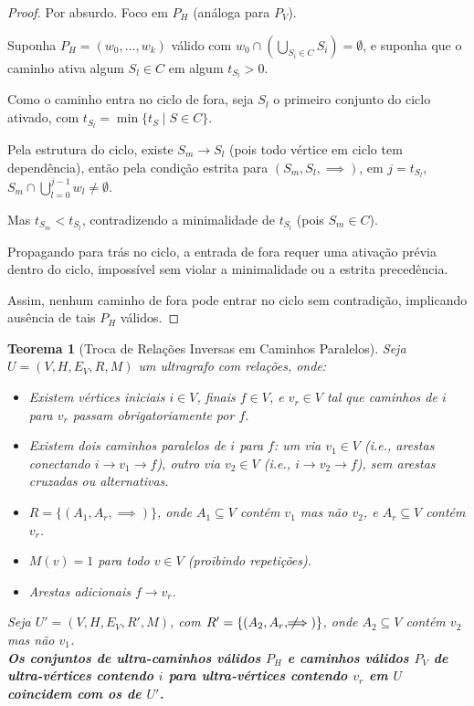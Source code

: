 \documentclass{article}
\newtheorem{theorem}{Teorema}
\begin{document}
\begin{proof}
Por absurdo. Foco em \( P_H \) (análoga para \( P_V \)).

Suponha \( P_H = (w_0, \dots, w_k) \) válido com \( w_0 \cap \left( \bigcup_{S_i \in C} S_i \right) = \emptyset \), e suponha que o caminho ativa algum \( S_l \in C \) em algum \( t_{S_l} > 0 \).

Como o caminho entra no ciclo de fora, seja \( S_l \) o primeiro conjunto do ciclo ativado, com \( t_{S_l} = \min \{ t_S \mid S \in C \} \).

Pela estrutura do ciclo, existe \( S_m \to S_l \) (pois todo vértice em ciclo tem dependência), então pela condição estrita para \( (S_m, S_l, \implies) \), em \( j = t_{S_l} \), \( S_m \cap \bigcup_{l=0}^{j-1} w_l \neq \emptyset \).

Mas \( t_{S_m} < t_{S_l} \), contradizendo a minimalidade de \( t_{S_l} \) (pois \( S_m \in C \)).

Propagando para trás no ciclo, a entrada de fora requer uma ativação prévia dentro do ciclo, impossível sem violar a minimalidade ou a estrita precedência.

Assim, nenhum caminho de fora pode entrar no ciclo sem contradição, implicando ausência de tais \( P_H \) válidos.
\end{proof}

\newpage
\begin{theorem}[Troca de Relações Inversas em Caminhos Paralelos]
\hfill

Seja \( U = (V, H, E_V, R, M) \) um ultragrafo com relações, onde:

\begin{itemize}
    \item Existem vértices iniciais \( i \in V \), finais \( f \in V \), e \( v_r \in V \) tal que caminhos de \( i \) para \( v_r \) passam obrigatoriamente por \( f \).
    \item Existem dois caminhos paralelos de \( i \) para \( f \): um via \( v_1 \in V \) (i.e., arestas conectando \( i \to v_1 \to f \)), outro via \( v_2 \in V \) (i.e., \( i \to v_2 \to f \)), sem arestas cruzadas ou alternativas.
    \item \( R = \{ (A_1, A_r, \implies) \} \), onde \( A_1 \subseteq V \) contém \( v_1 \) mas não \( v_2 \), e \( A_r \subseteq V \) contém \( v_r \).
    \item \( M(v) = 1 \) para todo \( v \in V \) (proibindo repetições).
    \item Arestas adicionais \( f \to v_r \).
\end{itemize}

Seja \( U' = (V, H, E_V, R', M) \), com \( R' = \{ (A_2, A_r, \not\!\!\!\implies) \} \), onde \( A_2 \subseteq V \) contém \( v_2 \) mas não \( v_1 \).
\\

\textbf{Os conjuntos de ultra-caminhos válidos \( P_H \) e caminhos válidos \( P_V \) de ultra-vértices contendo \( i \) para ultra-vértices contendo \( v_r \) em \( U \) coincidem com os de \( U' \).}
\end{theorem}
\end{document}
